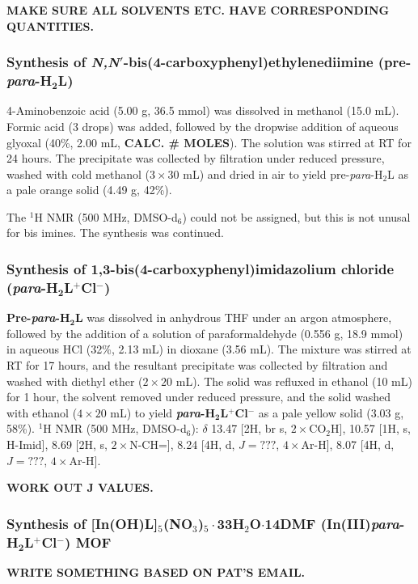 \documentclass[12pt,a4paper]{article}
\begin{document}
\textbf{MAKE SURE ALL SOLVENTS ETC. HAVE CORRESPONDING QUANTITIES.}

\subsubsection{Synthesis of \emph{N,N}$'$-bis(4-carboxyphenyl)ethylenediimine (\textbf{pre-\emph{para}-H$\bm{_2}$L})}\label{synth:para-L-step1}
4-Aminobenzoic acid (5.00 g, 36.5 mmol) was dissolved in methanol (15.0 mL). Formic acid (3 drops) was added, followed by the dropwise addition of aqueous glyoxal (40\%, 2.00 mL, \textbf{CALC. \# MOLES}). The solution was stirred at RT for 24 hours. The precipitate was collected by filtration under reduced pressure, washed with cold methanol ($3\times 30$ mL) and dried in air to yield pre-\emph{para}-H$_2$L as a pale orange solid (4.49 g, 42\%).

The $^1$H NMR (500 MHz, DMSO-d$_6$) could not be assigned, but this is not unusal for bis imines. The synthesis was continued.

\subsubsection{Synthesis of 1,3-bis(4-carboxyphenyl)imidazolium chloride (\textbf{\emph{para}-H$\bm{_2}$L$\bm{^+}$Cl$\bm{^-}$})}\label{synth:para-L-step2}
\textbf{Pre-\emph{para}-H$\bm{_2}$L} was dissolved in anhydrous THF under an argon atmosphere, followed by the addition of a solution of paraformaldehyde (0.556 g, 18.9 mmol) in aqueous HCl (32\%, 2.13 mL) in dioxane (3.56 mL). The mixture was stirred at RT for 17 hours, and the resultant precipitate was collected by filtration and washed with diethyl ether ($2 \times 20$ mL). The solid was refluxed in ethanol (10 mL) for 1 hour, the solvent removed under reduced pressure, and the solid washed with ethanol ($4\times 20$ mL) to yield \textbf{\emph{para}-H$\bm{_2}$L$\bm{^+}$Cl$\bm{^-}$} as a pale yellow solid (3.03 g, 58\%). $^1$H NMR (500 MHz, DMSO-d$_6$): $\delta$ 13.47 [2H, br s, $2\times$CO$_2$H], 10.57 [1H, s, H-Imid], 8.69 [2H, s, $2\times$N-CH=], 8.24 [4H, d, $J=???$, $4\times$Ar-H], 8.07 [4H, d, $J=???$, $4\times$Ar-H].

\textbf{WORK OUT J VALUES.}

\subsubsection{Synthesis of [In(OH)L]$_5$(NO$_3$)$_5\cdot$33H$_2$O$\cdot$14DMF (In(III)\textbf{\emph{para}-H$\bm{_2}$L$\bm{^+}$Cl$\bm{^-}$}) MOF}\label{synth:In-MOF}
\textbf{WRITE SOMETHING BASED ON PAT'S EMAIL.}
\end{document}
